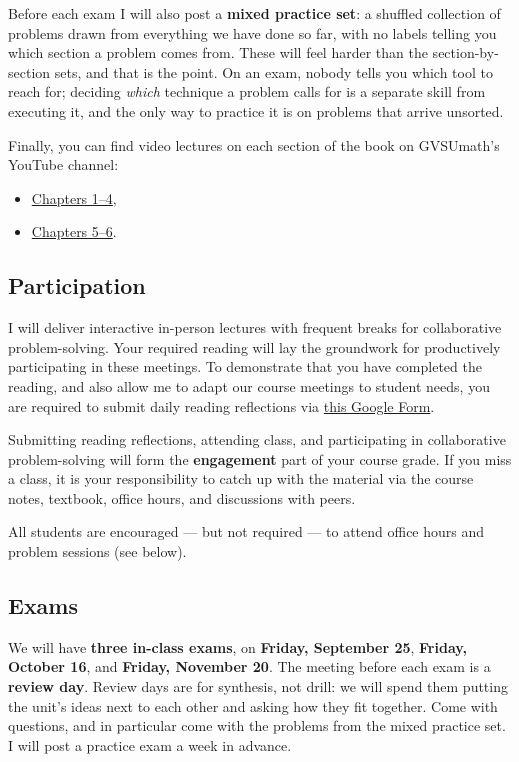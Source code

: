 \documentclass[11pt,twoside]{amsart}
\begin{document}
Before each exam I will also post a \textbf{mixed practice set}: a shuffled collection of problems drawn from everything we have done so far, with no labels telling you which section a problem comes from. These will feel harder than the section-by-section sets, and that is the point. On an exam, nobody tells you which tool to reach for; deciding \emph{which} technique a problem calls for is a separate skill from executing it, and the only way to practice it is on problems that arrive unsorted.

Finally, you can find video lectures on each section of the book on GVSUmath's YouTube channel:
\begin{itemize}
\item \href{https://www.youtube.com/playlist?list=PL9bIjQJDwfGuXQHuS5Jkmum_CFILoCZX-}{Chapters 1--4},
\item \href{https://www.youtube.com/playlist?list=PL9bIjQJDwfGtewW75Nw7PnGNSkfqwAm3v}{Chapters 5--6}.
\end{itemize}


\subsection*{Participation}
I will deliver interactive in-person lectures with frequent breaks for collaborative problem-solving. Your required reading will lay the groundwork for productively participating in these meetings. To demonstrate that you have completed the reading, and also allow me to adapt our course meetings to student needs, you are required to submit daily reading reflections via \href{https://docs.google.com/forms/d/e/1FAIpQLSdxdgkPt8zIwbsTJmZi3FsvcsQxY0sLmPuc_-qDOIrcYaZ_jg/viewform}{this Google Form}.

Submitting reading reflections, attending class, and participating in collaborative problem-solving will form the \textbf{engagement} part of your course grade. If you miss a class, it is your responsibility to catch up with the material via the course notes, textbook, office hours, and discussions with peers.

All students are encouraged --- but not required --- to attend office hours and problem sessions (see below).

\subsection*{Exams}\label{exams}
We will have \textbf{three in-class exams}, on \textbf{Friday, September 25}, \textbf{Friday, October 16}, and \textbf{Friday, November 20}. The meeting before each exam is a \textbf{review day}. Review days are for synthesis, not drill: we will spend them putting the unit's ideas next to each other and asking how they fit together. Come with questions, and in particular come with the problems from the mixed practice set. I will post a practice exam a week in advance.
\end{document}
